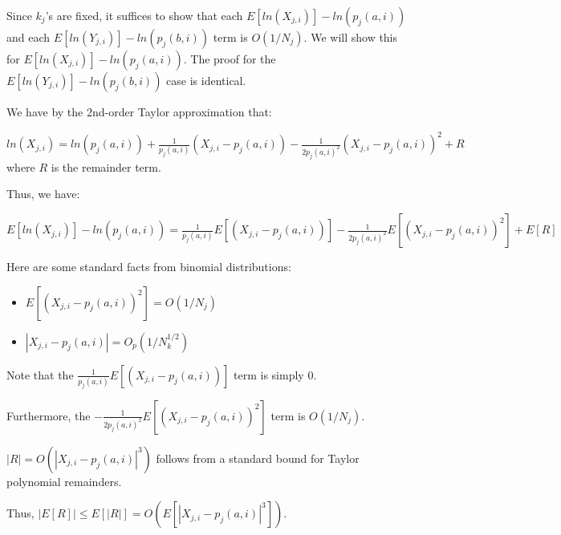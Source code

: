 \documentclass{article}
\begin{document}
Since $\displaystyle k_{j}$'s are fixed, it suffices to show that each $\displaystyle E\left[ ln\left( X_{j,i}\right)\right] -ln\left( p_{j}\left( a,i\right)\right)$ and each $\displaystyle E\left[ ln\left( Y_{j,i}\right)\right] -ln\left( p_{j}\left( b,i\right)\right)$ term is $\displaystyle O\left( 1/N_{j}\right)$. We will show this for $\displaystyle E\left[ ln\left( X_{j,i}\right)\right] -ln\left( p_{j}\left( a,i\right)\right)$. The proof for the $\displaystyle E\left[ ln\left( Y_{j,i}\right)\right] -ln\left( p_{j}\left( b,i\right)\right)$ case is identical.

We have by the 2nd-order Taylor approximation that:

$\displaystyle ln\left( X_{j,i}\right) =ln\left( p_{j}\left( a,i\right)\right) +\frac{1}{p_{j}\left( a,i\right)}\left( X_{j,i} -p_{j}\left( a,i\right)\right) -\frac{1}{2p_{j}\left( a,i\right)^{2}}\left( X_{j,i} -p_{j}\left( a,i\right)\right)^{2} +R$ where $\displaystyle R$ is the remainder term.

Thus, we have:

$\displaystyle E\left[ ln\left( X_{j,i}\right)\right] -ln\left( p_{j}\left( a,i\right)\right) =\frac{1}{p_{j}\left( a,i\right)} E\left[\left( X_{j,i} -p_{j}\left( a,i\right)\right)\right] -\frac{1}{2p_{j}\left( a,i\right)^{2}} E\left[\left( X_{j,i} -p_{j}\left( a,i\right)\right)^{2}\right] +E\left[ R\right]$

Here are some standard facts from binomial distributions:
\begin{itemize}
\item $\displaystyle E\left[\left( X_{j,i} -p_{j}\left( a,i\right)\right)^{2}\right] =O\left( 1/N_{j}\right)$
\item $\displaystyle |X_{j,i} -p_{j}\left( a,i\right) |=O_{p}\left( 1/N_{k}^{1/2}\right)$
\end{itemize}

Note that the $\displaystyle \frac{1}{p_{j}\left( a,i\right)} E\left[\left( X_{j,i} -p_{j}\left( a,i\right)\right)\right]$ term is simply 0.

Furthermore, the $\displaystyle -\frac{1}{2p_{j}\left( a,i\right)^{2}} E\left[\left( X_{j,i} -p_{j}\left( a,i\right)\right)^{2}\right]$ term is $\displaystyle O\left( 1/N_{j}\right)$.

$\displaystyle |R|=O\left( |X_{j,i} -p_{j}\left( a,i\right) |^{3}\right)$ follows from a standard bound for Taylor polynomial remainders.

Thus, $\displaystyle |E\left[ R\right] |\leqslant E\left[ |R|\right] =O\left( E\left[ |X_{j,i} -p_{j}\left( a,i\right) |^{3}\right]\right)$.
\end{document}
